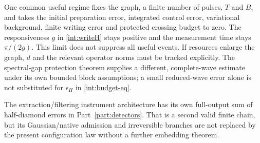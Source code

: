 \documentclass[11pt,oneside,openany]{book}
\theoremstyle{definition}
\theoremstyle{remark}\newtheorem{remark}[theorem]{Remark}
\begin{document}
One common useful regime fixes the graph, a finite number of pulses, $T$ and $B$, and takes the initial preparation error, integrated control error, variational background, finite writing error and protected crossing budget to zero. The responsiveness $g$ in \eqref{int:writeH} stays positive and the measurement time stays $\pi/(2g)$. This limit does not suppress all useful events. If resources enlarge the graph, $d$ and the relevant operator norms must be tracked explicitly. The spectral-gap protection theorem supplies a different, complete-wave estimate under its own bounded block assumptions; a small reduced-wave error alone is not substituted for $\epsilon_H$ in \eqref{int:budget-eq}.

The extraction/filtering instrument architecture has its own full-output sum of half-diamond errors in Part~\ref{part:detectors}. That is a second valid finite chain, but its Gaussian/native admission and irreversible branches are not replaced by the present configuration law without a further embedding theorem.
\end{document}
